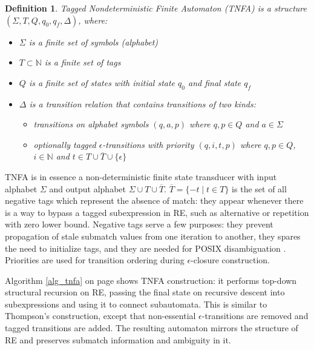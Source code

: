 \documentclass[]{article}
\newtheorem{definition}{Definition}
\newcommand*{\Xbar}[1]{\overline{#1}}
\newcommand{\YN}{\mathbb{N}}
\begin{document}
\begin{definition} \label{def_tnfa}
Tagged Nondeterministic Finite Automaton (TNFA)
is a structure $(\Sigma, T, Q, q_0, q_f, \Delta)$, where:
\begin{itemize}
    \item[] $\Sigma$ is a finite set of symbols (alphabet)
    \item[] $T \subset \YN$ is a finite set of tags
    \item[] $Q$ is a finite set of states with initial state $q_0$ and final state $q_f$
    \item[] $\Delta$ is a transition relation that contains transitions of two kinds:
    \begin{itemize}
        \item[] transitions on alphabet symbols $(q, a, p)$ where $q, p \in Q$ and $a \in \Sigma$
        \item[] optionally tagged $\epsilon$-transitions with priority $(q, i, t, p)$ where $q, p \in Q$, $i \in \YN$ and $t \in T \cup \Xbar{T} \cup \{\epsilon\}$
    \end{itemize}
\end{itemize}
\end{definition}

TNFA is in essence a non-deterministic finite state transducer with input alphabet $\Sigma$ and output alphabet $\Sigma \cup T \cup \Xbar{T}$.
$\Xbar{T} = \{-t \mid t \in T\}$ is the set of all negative tags which represent the absence of match: they appear whenever there is a way to bypass a tagged subexpression in RE,
such as alternative or repetition with zero lower bound.
Negative tags serve a few purposes:
they prevent propagation of stale submatch values from one iteration to another,
they spares the need to initialize tags,
and they are needed for POSIX disambiguation \cite{BorTro19}.
Priorities are used for transition ordering during $\epsilon$-closure construction.
\medskip

Algorithm \ref{alg_tnfa} on page \pageref{alg_tnfa} shows TNFA construction:
it performs top-down structural recursion on RE, passing the final state on recursive descent into subexpressions
and using it to connect subautomata.
This is similar to Thompson's construction, except that non-essential $\epsilon$-transitions are removed and tagged transitions are added.
The resulting automaton mirrors the structure of RE and preserves submatch information and ambiguity in it.
\end{document}
